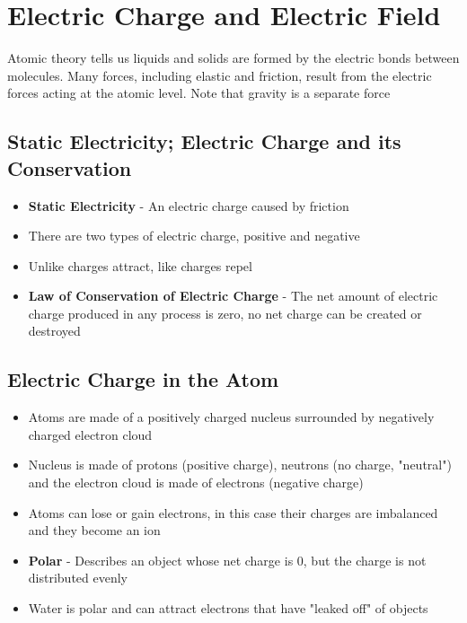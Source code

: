 \section{Electric Charge and Electric Field}
Atomic theory tells us liquids and solids are formed by the electric bonds between molecules. Many forces, including elastic and friction, result from the electric forces acting at the atomic level. Note that gravity is a separate force

\subsection{Static Electricity; Electric Charge and its Conservation}
\begin{itemize}
    \item \textbf{Static Electricity} - An electric charge caused by friction
    \item There are two types of electric charge, positive and negative 
    \item Unlike charges attract, like charges repel
    \item \textbf{Law of Conservation of Electric Charge} - The net amount of electric charge produced in any process is zero, no net charge can be created or destroyed
\end{itemize}

\subsection{Electric Charge in the Atom}
\begin{itemize}
    \item Atoms are made of a positively charged nucleus surrounded by negatively charged electron cloud
    \item Nucleus is made of protons (positive charge), neutrons (no charge, "neutral") and the electron cloud is made of electrons (negative charge)
    \item Atoms can lose or gain electrons, in this case their charges are imbalanced and they become an ion
    \item \textbf{Polar} - Describes an object whose net charge is 0, but the charge is not distributed evenly
    \item Water is polar and can attract electrons that have "leaked off" of objects
\end{itemize}

